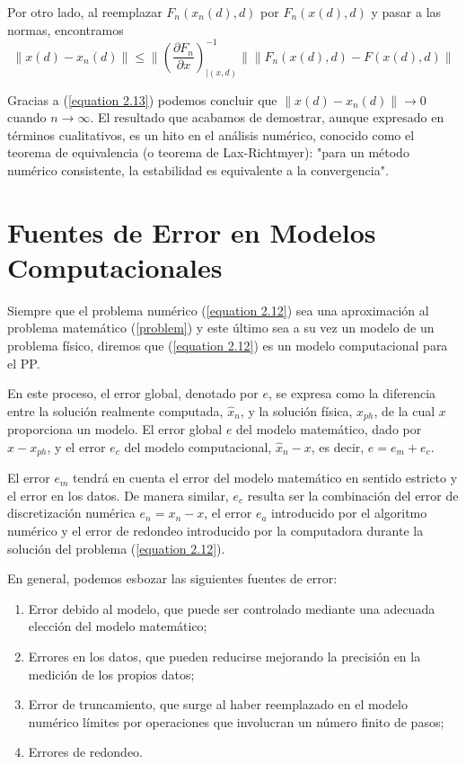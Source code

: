 Por otro lado, al reemplazar $F_n(x_n(d), d)$ por $F_n(x(d), d)$ y pasar a las normas, encontramos
\[
\| x(d) - x_n(d) \| \leq \| \left( \frac{\partial F_n}{\partial x} \right)^{-1}_{|(x,d)} \| \| F_n(x(d),d) - F(x(d), d)\|
\]

Gracias a (\ref{equation 2.13}) podemos concluir que $\|x(d) - x_n(d)\| \rightarrow 0$ cuando $n \rightarrow \infty$. El resultado que acabamos de demostrar, aunque expresado en términos cualitativos, es un hito en el análisis numérico, conocido como el teorema de equivalencia (o teorema de Lax-Richtmyer): "para un método numérico consistente, la estabilidad es equivalente a la convergencia".

\section{Fuentes de Error en Modelos Computacionales}

Siempre que el problema numérico (\ref{equation 2.12}) sea una aproximación al problema matemático (\ref{problem}) y este último sea a su vez un modelo de un problema físico, diremos que (\ref{equation 2.12}) es un modelo computacional para el PP.

En este proceso, el error global, denotado por $e$, se expresa como la diferencia entre la solución realmente computada, $\hat{x}_n$, y la solución física, $x_{ph}$, de la cual $x$ proporciona un modelo. El error global $e$ del modelo matemático, dado por $x - x_{ph}$, y el error $e_c$ del modelo computacional, $\hat{x}_n - x$, es decir, $e = e_m + e_c$.

El error $e_m$ tendrá en cuenta el error del modelo matemático en sentido estricto y el error en los datos. De manera similar, $e_c$ resulta ser la combinación del error de discretización numérica $e_n = x_n - x$, el error $e_a$ introducido por el algoritmo numérico y el error de redondeo introducido por la computadora durante la solución del problema (\ref{equation 2.12}).

En general, podemos esbozar las siguientes fuentes de error:
\begin{enumerate}
    \item Error debido al modelo, que puede ser controlado mediante una adecuada elección del modelo matemático;
    \item Errores en los datos, que pueden reducirse mejorando la precisión en la medición de los propios datos;
    \item Error de truncamiento, que surge al haber reemplazado en el modelo numérico límites por operaciones que involucran un número finito de pasos;
    \item Errores de redondeo.
\end{enumerate}

